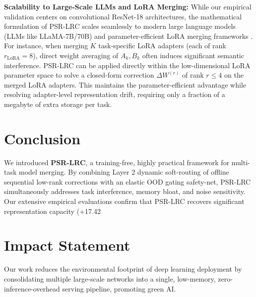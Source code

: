 \documentclass{article}
\theoremstyle{plain}
\theoremstyle{definition}
\theoremstyle{remark}
\begin{document}
\textbf{Scalability to Large-Scale LLMs and LoRA Merging:} While our empirical validation centers on convolutional ResNet-18 architectures, the mathematical formulation of PSR-LRC scales seamlessly to modern large language models (LLMs like LLaMA-7B/70B) and parameter-efficient LoRA merging frameworks \cite{hu2021lora, pfeiffer2020adapterhub}. For instance, when merging $K$ task-specific LoRA adapters (each of rank $r_{\text{LoRA}} = 8$), direct weight averaging of $A_k, B_k$ often induces significant semantic interference. PSR-LRC can be applied directly within the low-dimensional LoRA parameter space to solve a closed-form correction $\Delta W^{(r)}$ of rank $r \le 4$ on the merged LoRA adapters. This maintains the parameter-efficient advantage while resolving adapter-level representation drift, requiring only a fraction of a megabyte of extra storage per task.

\section{Conclusion}
\label{sec:conclusion}
We introduced \textbf{PSR-LRC}, a training-free, highly practical framework for multi-task model merging. By combining Layer 2 dynamic soft-routing of offline sequential low-rank corrections with an elastic OOD gating safety-net, PSR-LRC simultaneously addresses task interference, memory bloat, and noise sensitivity. Our extensive empirical evaluations confirm that PSR-LRC recovers significant representation capacity (+17.42%

\section*{Impact Statement}
Our work reduces the environmental footprint of deep learning deployment by consolidating multiple large-scale networks into a single, low-memory, zero-inference-overhead serving pipeline, promoting green AI.





\newpage
\appendix
\onecolumn
\end{document}
